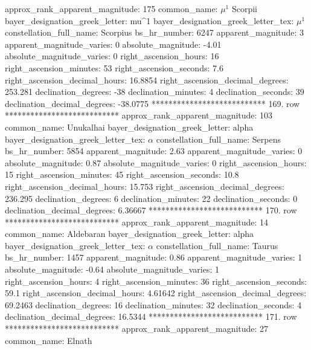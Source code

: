     approx_rank_apparent_magnitude: 175
                       common_name: $\mu^1$ Scorpii
    bayer_designation_greek_letter: mu^1
bayer_designation_greek_letter_tex: $\mu^1$
           constellation_full_name: Scorpius
                      bs_hr_number: 6247
                apparent_magnitude: 3
         apparent_magnitude_varies: 0
                absolute_magnitude: -4.01
         absolute_magnitude_varies: 0
             right_ascension_hours: 16
           right_ascension_minutes: 53
           right_ascension_seconds: 7.6
     right_ascension_decimal_hours: 16.8854
   right_ascension_decimal_degrees: 253.281
               declination_degrees: -38
               declination_minutes: 4
               declination_seconds: 39
       declination_decimal_degrees: -38.0775
*************************** 169. row ***************************
    approx_rank_apparent_magnitude: 103
                       common_name: Unukalhai
    bayer_designation_greek_letter: alpha
bayer_designation_greek_letter_tex: $\alpha$
           constellation_full_name: Serpens
                      bs_hr_number: 5854
                apparent_magnitude: 2.63
         apparent_magnitude_varies: 0
                absolute_magnitude: 0.87
         absolute_magnitude_varies: 0
             right_ascension_hours: 15
           right_ascension_minutes: 45
           right_ascension_seconds: 10.8
     right_ascension_decimal_hours: 15.753
   right_ascension_decimal_degrees: 236.295
               declination_degrees: 6
               declination_minutes: 22
               declination_seconds: 0
       declination_decimal_degrees: 6.36667
*************************** 170. row ***************************
    approx_rank_apparent_magnitude: 14
                       common_name: Aldebaran
    bayer_designation_greek_letter: alpha
bayer_designation_greek_letter_tex: $\alpha$
           constellation_full_name: Taurus
                      bs_hr_number: 1457
                apparent_magnitude: 0.86
         apparent_magnitude_varies: 1
                absolute_magnitude: -0.64
         absolute_magnitude_varies: 1
             right_ascension_hours: 4
           right_ascension_minutes: 36
           right_ascension_seconds: 59.1
     right_ascension_decimal_hours: 4.61642
   right_ascension_decimal_degrees: 69.2463
               declination_degrees: 16
               declination_minutes: 32
               declination_seconds: 4
       declination_decimal_degrees: 16.5344
*************************** 171. row ***************************
    approx_rank_apparent_magnitude: 27
                       common_name: Elnath
